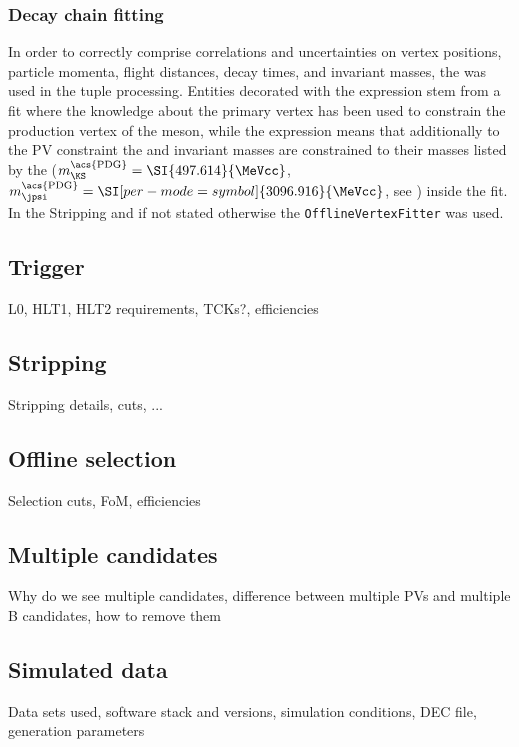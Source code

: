\subsubsection*{Decay chain fitting}
In order to correctly comprise correlations and uncertainties on vertex
positions, particle momenta, flight distances, decay times, and invariant
masses, the \DTF \cite{Hulsbergen:2005pu} was used in the tuple processing.
Entities decorated with the expression \dtfpv stem from a \DTF fit where the
knowledge about the primary vertex has been used to constrain the production
vertex of the \Bd meson, while the expression \dtf means that additionally to
the PV constraint the \jpsi and \KS invariant masses are constrained to their
masses listed by the \PDG ($m_{\KS}^{\text{\acs{PDG}}}=\SI{497.614}{\MeVcc}$,
$m_{\jpsi}^{\text{\acs{PDG}}} = \SI[per-mode=symbol]{3096.916}{\MeVcc}$, see
\cite{Agashe:2014kda}) inside the \DTF fit. In the Stripping and if not stated
otherwise the \verb=OfflineVertexFitter=  was used.

\subsection{Trigger}
\label{sec:measurement_of_sin2beta:trigger}
L0, HLT1, HLT2 requirements, TCKs?, efficiencies

\subsection{Stripping}
\label{sec:measurement_of_sin2beta:stripping}
Stripping details, cuts, ...

\subsection{Offline selection}
\label{sec:measurement_of_sin2beta:offline_selection}
Selection cuts, FoM, efficiencies

\subsection{Multiple candidates}
Why do we see multiple candidates, difference between multiple PVs and multiple B candidates, how to remove them

\subsection{Simulated data}
Data sets used, software stack and versions, simulation conditions, DEC file, generation parameters

